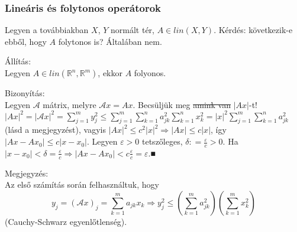 \documentclass[12pt,a4paper]{scrartcl}
\newenvironment{bizonyitas}{}{}
\newenvironment{allitas}{}{}
\newenvironment{megjegyzes}{}{}
\begin{document}
\hypertarget{linearis-es-folytonos-operatorok}{%
\subsubsection{Lineáris és folytonos
operátorok}\label{linearis-es-folytonos-operatorok}}

Legyen a továbbiakban \(X\), \(Y\) normált tér,
\(A \in {lin}\left( {X,Y} \right)\). Kérdés: következik-e ebből, hogy
\(A\) folytonos is? Általában nem.

\begin{allitas}

Állítás:\\
Legyen
\(A \in {lin}\left( {{\mathbb{R}}^{n},{\mathbb{R}}^{m}} \right)\), ekkor
\(A\) folyonos.

\end{allitas}

\begin{bizonyitas}

Bizonyítás:\\
Legyen \(\mathcal{A}\) mátrix, melyre \(\mathcal{A}x = Ax\). Becsüljük
meg \sout{amink van} \(\left| {Ax} \right|\)-t!
\(\left| {Ax} \right|^{2} = \left| {\mathcal{A}x} \right|^{2} = {\sum\limits_{j = 1}^{m}y_{j}^{2}} \leq {\sum\limits_{j = 1}^{m}{\sum\limits_{k = 1}^{n}{a_{jk}^{2}{\sum\limits_{k = 1}^{n}x_{k}^{2}}}}} = \left| x \right|^{2}{\sum\limits_{j = 1}^{m}{\sum\limits_{k = 1}^{n}a_{jk}^{2}}}\)
(lásd a megjegyzést), vagyis
\(\left. \left| {Ax} \right|^{2} \leq c^{2}\left| x \right|^{2}\Rightarrow\left| {Ax} \right| \leq c\left| x \right| \right.\),
így \(\left| {Ax - Ax_{0}} \right| \leq c\left| {x - x_{0}} \right|\).
Legyen \(\varepsilon > 0\) tetszőleges,
\(\delta: = \frac{\varepsilon}{c} > 0\). Ha
\(\left. \left| {x - x_{0}} \right| < \delta = \frac{\varepsilon}{c}\Rightarrow\left| {Ax - Ax_{0}} \right| < c\frac{\varepsilon}{c} = \varepsilon \right.\).■

\end{bizonyitas}

\begin{megjegyzes}

Megjegyzés:\\
Az első számítás során felhasználtuk, hogy
\[\left. y_{j} = \left( {\mathcal{A}x} \right)_{j} = {\sum\limits_{k = 1}^{m}{a_{jk}x_{k}}}\Rightarrow y_{j}^{2} \leq \left( {\sum\limits_{k = 1}^{m}a_{jk}^{2}} \right)\left( {\sum\limits_{k = 1}^{m}x_{k}^{2}} \right) \right.\]
(Cauchy-Schwarz egyenlőtlenség).

\end{megjegyzes}
\end{document}
